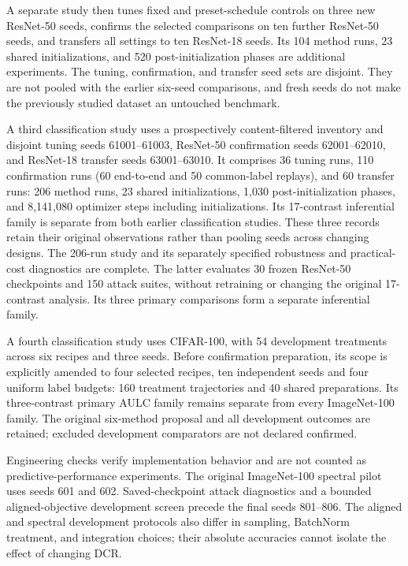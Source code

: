 \documentclass[10pt,a4paper,twocolumn]{article}
\begin{document}
A separate study then tunes fixed and preset-schedule controls on three
new ResNet-50 seeds, confirms the selected comparisons on ten further
ResNet-50 seeds, and transfers all settings to ten ResNet-18 seeds.
Its 104 method runs, 23 shared initializations, and 520 post-initialization
phases are additional experiments. The tuning, confirmation, and transfer
seed sets are disjoint. They are not pooled with the earlier six-seed
comparisons, and fresh seeds do not make the previously studied dataset
an untouched benchmark.

A third classification study uses a prospectively content-filtered
inventory and disjoint tuning seeds 61001--61003, ResNet-50 confirmation
seeds 62001--62010, and ResNet-18 transfer seeds 63001--63010. It comprises
36 tuning runs, 110 confirmation runs (60 end-to-end and 50 common-label
replays), and 60 transfer runs: 206 method runs, 23 shared initializations,
1,030 post-initialization phases, and 8,141,080 optimizer steps including
initializations. Its 17-contrast inferential family is separate from
both earlier classification studies. These three records retain their
original observations rather than pooling seeds across changing designs.
The 206-run study and its separately specified robustness and
practical-cost diagnostics are complete. The latter evaluates 30 frozen
ResNet-50 checkpoints and 150 attack suites, without retraining or
changing the original 17-contrast analysis. Its three primary comparisons
form a separate inferential family.

A fourth classification study uses CIFAR-100, with 54 development
treatments across six recipes and three seeds. Before confirmation
preparation, its scope is explicitly amended to four selected recipes,
ten independent seeds and four uniform label budgets: 160 treatment
trajectories and 40 shared preparations. Its three-contrast primary AULC
family remains separate from every ImageNet-100 family. The original
six-method proposal and all development outcomes are retained; excluded
development comparators are not declared confirmed.

Engineering checks verify implementation behavior and are not counted
as predictive-performance experiments. The original ImageNet-100
spectral pilot uses seeds 601 and 602. Saved-checkpoint attack
diagnostics and a bounded aligned-objective development screen
precede the final seeds 801--806. The aligned and spectral
development protocols also differ in sampling, BatchNorm treatment,
and integration choices; their absolute accuracies cannot isolate
the effect of changing DCR.
\end{document}

